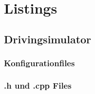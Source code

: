 \section{Listings}

\subsection{Drivingsimulator}
\subsubsection{Konfigurationfiles}

\label{listing:plugins.cfg}


\label{listing:graphics.cfg}


\label{listing:resources.cfg}


\subsubsection{.h und .cpp Files}

\label{listing:DrivingSimulatorV1.h}

\label{listing:DrivingSimulatorV1.cpp}


\label{listing:DrivingSimulatorV1.h}

\label{listing:DrivingSimulatorV1.cpp}


